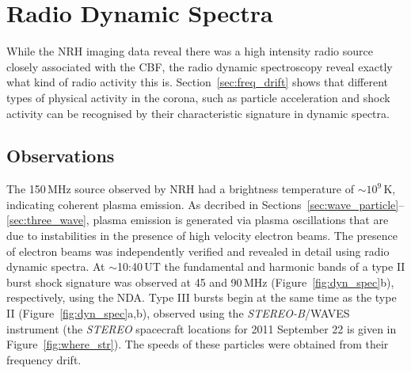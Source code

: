\section{Radio Dynamic Spectra}\label{sec:20}

While the NRH imaging data reveal there was a high intensity radio source closely associated with the CBF, the radio dynamic spectroscopy reveal exactly what kind of radio activity this is. Section~\ref{sec:freq_drift} shows that different types of physical activity in the corona, such as particle acceleration and shock activity can be recognised by their characteristic signature in dynamic spectra. 

\subsection{Observations}
The 150\,MHz source observed by NRH had a brightness temperature of $\sim$$10^9$\,K, indicating coherent plasma emission. As decribed in Sections~\ref{sec:wave_particle}--\ref{sec:three_wave}, plasma emission is generated via plasma oscillations that are due to instabilities in the presence of high velocity electron beams. The presence of electron beams was independently verified and revealed in detail using radio dynamic spectra. At $\sim$10:40\,UT the fundamental and harmonic bands of a type II burst shock signature was observed at 45 and 90\,MHz (Figure~\ref{fig:dyn_spec}b), respectively, using the NDA. Type III bursts begin at the same time as the type II (Figure~\ref{fig:dyn_spec}a,b), observed using the \emph{STEREO-B}/WAVES instrument {\color{blue}(the \emph{STEREO} spacecraft locations for 2011 September 22 is given in Figure~\ref{fig:where_str})}. The speeds of these particles were obtained from their frequency drift.

